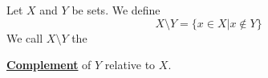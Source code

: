 \label{def:SetComplement}
\newcommand{\SetComplement}[0]{
    \textbf{\hyperref[def:SetComplement]{Complement}}
}
\newcommand{\SetComplements}[0]{
    \textbf{\hyperref[def:SetComplement]{Complements}}
}
\begin{df}
    Let $X$ and $Y$ be sets. 
    We define 
    \begin{equation*}
        X \setminus Y= \{x \in X | x \not \in Y\}
    \end{equation*}
    We call $X \setminus Y$ the 
    \SetComplement of $Y$ relative to $X$. 
\end{df}
